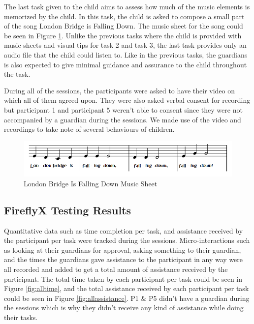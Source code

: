 The last task given to the child aims to assess how much of the music elements is memorized by the child. In this task, the child is asked to compose a small part of the song London Bridge is Falling Down. The music sheet for the song could be seen in Figure \ref{fig:LBIFDMusicSheet}. Unlike the previous tasks where the child is provided with music sheets and visual tips for task 2 and task 3, the last task provides only an audio file that the child could listen to. Like in the previous tasks, the guardians is also expected to give minimal guidance and assurance to the child throughout the task. 

During all of the sessions, the participants were asked to have their video on which all of them agreed upon. They were also asked verbal consent for recording but participant 1 and participant 5 weren't able to consent since they were not accompanied by a guardian during the sessions. We made use of the video and recordings to take note of several behaviours of children. 

\begin{figure}[H]
    \centering
    \includegraphics[width=15cm]{figures/NewFigures/LondonBridgeMusicSheet.png}
    \caption{London Bridge Is Falling Down Music Sheet}
    \label{fig:LBIFDMusicSheet}
\end{figure}


\subsection{FireflyX Testing Results}
Quantitative data such as time completion per task, and assistance received by the participant per task were tracked during the sessions. Micro-interactions such as looking at their guardians for approval, asking something to their guardian, and the times the guardians gave assistance to the participant in any way were all recorded and added to get a total amount of assistance received by the participant. The total time taken by each participant per task could be seen in Figure \ref{fig:alltime}, and the total assistance received by each participant per task could be seen in Figure \ref{fig:allassistance}. P1 & P5 didn't have a guardian during the sessions which is why they didn't receive any kind of assistance while doing their tasks.


